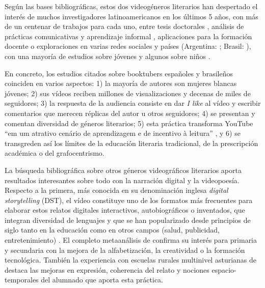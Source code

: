 \documentclass[spanish]{textolivre}
\begin{document}
Según las bases bibliográficas, estos dos videogéneros literarios han despertado el interés de muchos investigadores latinoamericanos en los últimos 5 años, con más de un centenar de trabajos para cada uno, entre tesis doctorales \cite{tomasena_glennie_booktubers_2020,paladines_literacy_2022}, análisis de prácticas comunicativas y aprendizaje informal \cite{vizcaino-verdu_reading_2019}, aplicaciones para la formación docente \cite{ibarra_rius_book_2016,heredia-ponce_booktrailer_2020} o exploraciones en varias redes sociales \cite{quiles_cabrera_textos_2020} y países (Argentina: \cite{albarello_booktubers_2019}; Brasil: \cite{fialho_booktubers_2023}), con una mayoría de estudios sobre jóvenes y algunos sobre niños \cite{lopez-gil_promocion_2021}. 

En concreto, los estudios citados sobre booktubers españoles y brasileños coinciden en varios aspectos: 1) la mayoría de autores son mujeres blancas jóvenes; 2) sus vídeos reciben millones de visualizaciones y decenas de miles de seguidores; 3) la respuesta de la audiencia consiste en dar \textit{I like} al vídeo y escribir comentarios que merecen réplicas del autor u otros seguidores; 4) se presentan y comentan diversidad de géneros literarios; 5) esta práctica transforma YouTube “em um atrativo cenário de aprendizagem e de incentivo à leitura” \cite{fialho_booktubers_2023}, y 6) se transgreden así los límites de la educación literaria tradicional, de la prescripción académica o del grafocentrismo.

La búsqueda bibliográfica sobre otros géneros videográficos literarios aporta resultados interesantes sobre todo con la narración digital y la videopoesía. Respecto a la primera, más conocida en su denominación inglesa \textit{digital storytelling} (DST), el vídeo constituye uno de los formatos más frecuentes para elaborar estos relatos digitales interactivos, autobiográficos o inventados, que integran diversidad de lenguajes y que se han popularizado desde principios de siglo tanto en la educación como en otros campos (salud, publicidad, entretenimiento) \cite{godwin-jones_digital_2012}. El completo metaanálisis de \textcite{quah_systematic_2022} confirma su interés para primaria y secundaria con la mejora de la alfabetización, la creatividad o la formación tecnológica. También la experiencia con escuelas rurales multinivel asturianas de \textcite{del_moral_perez_competencias_2017} destaca las mejoras en expresión, coherencia del relato y nociones espacio-temporales del alumnado que aporta esta práctica.
\end{document}

